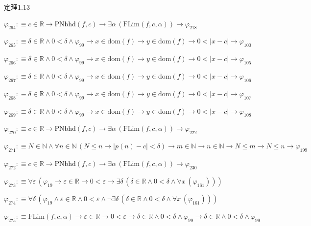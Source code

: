 \begin{fullproof}{定理1.13}
\begin{abbrevlist}
\item $\varphi_{264} :\equiv c \in \mathbb{R} \to \mathrm{PNbhd}(f,c) \to \exists \alpha\,(\mathrm{FLim}(f,c,\alpha)) \to \varphi_{218}$
\item $\varphi_{265} :\equiv \delta \in \mathbb{R} \land 0 < \delta \land \varphi_{99} \to x \in \mathrm{dom}(f) \to y \in \mathrm{dom}(f) \to 0 < \lvert x - c \rvert \to \varphi_{100}$
\item $\varphi_{266} :\equiv \delta \in \mathbb{R} \land 0 < \delta \land \varphi_{99} \to x \in \mathrm{dom}(f) \to y \in \mathrm{dom}(f) \to 0 < \lvert x - c \rvert \to \varphi_{105}$
\item $\varphi_{267} :\equiv \delta \in \mathbb{R} \land 0 < \delta \land \varphi_{99} \to x \in \mathrm{dom}(f) \to y \in \mathrm{dom}(f) \to 0 < \lvert x - c \rvert \to \varphi_{106}$
\item $\varphi_{268} :\equiv \delta \in \mathbb{R} \land 0 < \delta \land \varphi_{99} \to x \in \mathrm{dom}(f) \to y \in \mathrm{dom}(f) \to 0 < \lvert x - c \rvert \to \varphi_{107}$
\item $\varphi_{269} :\equiv \delta \in \mathbb{R} \land 0 < \delta \land \varphi_{99} \to x \in \mathrm{dom}(f) \to y \in \mathrm{dom}(f) \to 0 < \lvert x - c \rvert \to \varphi_{108}$
\item $\varphi_{270} :\equiv c \in \mathbb{R} \to \mathrm{PNbhd}(f,c) \to \exists \alpha\,(\mathrm{FLim}(f,c,\alpha)) \to \varphi_{222}$
\item $\varphi_{271} :\equiv N \in \mathbb{N} \land \forall n \in \mathbb{N}\,(N \leq n \to \lvert p(n) - c \rvert < \delta) \to m \in \mathbb{N} \to n \in \mathbb{N} \to N \leq m \to N \leq n \to \varphi_{199}$
\item $\varphi_{272} :\equiv c \in \mathbb{R} \to \mathrm{PNbhd}(f,c) \to \exists \alpha\,(\mathrm{FLim}(f,c,\alpha)) \to \varphi_{230}$
\item $\varphi_{273} :\equiv \forall \varepsilon\,(\varphi_{19} \to \varepsilon \in \mathbb{R} \to 0 < \varepsilon \to \exists \delta\,(\delta \in \mathbb{R} \land 0 < \delta \land \forall x\,(\varphi_{161})))$
\item $\varphi_{274} :\equiv \forall \delta\,(\varphi_{19} \land \varepsilon \in \mathbb{R} \land 0 < \varepsilon \land \neg \exists \delta\,(\delta \in \mathbb{R} \land 0 < \delta \land \forall x\,(\varphi_{161})))$
\item $\varphi_{275} :\equiv \mathrm{FLim}(f,c,\alpha) \to \varepsilon \in \mathbb{R} \to 0 < \varepsilon \to \delta \in \mathbb{R} \land 0 < \delta \land \varphi_{99} \to \delta \in \mathbb{R} \land 0 < \delta \land \varphi_{99}$

\end{abbrevlist}
\end{fullproof}
